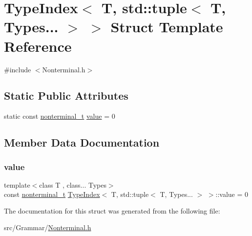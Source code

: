 \hypertarget{struct_type_index_3_01_t_00_01std_1_1tuple_3_01_t_00_01_types_8_8_8_01_4_01_4}{}\section{Type\+Index$<$ T, std\+:\+:tuple$<$ T, Types... $>$ $>$ Struct Template Reference}
\label{struct_type_index_3_01_t_00_01std_1_1tuple_3_01_t_00_01_types_8_8_8_01_4_01_4}


{\ttfamily \#include $<$Nonterminal.\+h$>$}

\subsection*{Static Public Attributes}
\begin{DoxyCompactItemize}
\item 
static const \hyperlink{_nonterminal_8h_a5c1f658dc7560600a16d22408bd716ca}{nonterminal\+\_\+t} \hyperlink{struct_type_index_3_01_t_00_01std_1_1tuple_3_01_t_00_01_types_8_8_8_01_4_01_4_a163ba00344b287c191f05761d34556d2}{value} = 0
\end{DoxyCompactItemize}


\subsection{Member Data Documentation}
\mbox{\label{struct_type_index_3_01_t_00_01std_1_1tuple_3_01_t_00_01_types_8_8_8_01_4_01_4_a163ba00344b287c191f05761d34556d2}} 
\subsubsection{\texorpdfstring{value}{value}}
{\footnotesize\ttfamily template$<$class T , class... Types$>$ \\
const \hyperlink{_nonterminal_8h_a5c1f658dc7560600a16d22408bd716ca}{nonterminal\+\_\+t} \hyperlink{struct_type_index}{Type\+Index}$<$ T, std\+::tuple$<$ T, Types... $>$ $>$\+::value = 0\hspace{0.3cm}{\ttfamily [static]}}



The documentation for this struct was generated from the following file\+:\begin{DoxyCompactItemize}
\item 
src/\+Grammar/\hyperlink{_nonterminal_8h}{Nonterminal.\+h}\end{DoxyCompactItemize}
